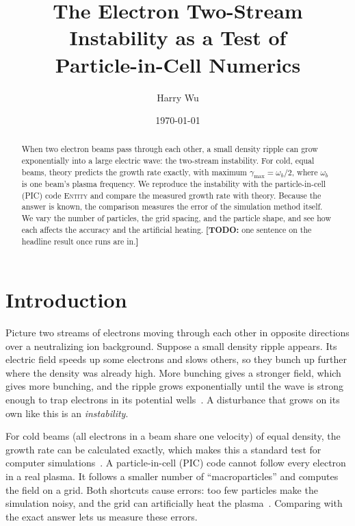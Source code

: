 \documentclass[10pt,twocolumn,letterpaper]{article}
\title{\vspace{-1.5em}The Electron Two-Stream Instability as a Test of\\
       Particle-in-Cell Numerics}
\author{Harry Wu}
\date{\today}
\newcommand{\wb}{\omega_b}            %
\newif\ifdraft \drafttrue
\newcommand{\todo}[1]{\ifdraft{\color{red}\textbf{[TODO:} #1\textbf{]}}\fi}
\begin{document}
\maketitle

\begin{abstract}
\noindent
When two electron beams pass through each other, a small density ripple can grow exponentially
into a large electric wave: the two-stream instability. For cold, equal beams, theory predicts
the growth rate exactly, with maximum $\gamma_{\max}=\wb/2$, where $\wb$ is one beam's plasma
frequency. We reproduce the instability with the particle-in-cell (PIC) code \textsc{Entity}
and compare the measured growth rate with theory. Because the answer is known, the comparison
measures the error of the simulation method itself. We vary the number of particles, the grid
spacing, and the particle shape, and see how each affects the accuracy and the artificial heating.
\todo{one sentence on the headline result once runs are in.}
\end{abstract}

\section{Introduction}
\label{sec:intro}

Picture two streams of electrons moving through each other in opposite directions over a
neutralizing ion background. Suppose a small density ripple appears. Its electric field speeds
up some electrons and slows others, so they bunch up further where the density was already high.
More bunching gives a stronger field, which gives more bunching, and the ripple grows
exponentially until the wave is strong enough to trap electrons in its potential
wells~\citep{BohmGross1949,Chen2016}. A disturbance that grows on its own like this is an
\emph{instability}.

For cold beams (all electrons in a beam share one velocity) of equal density, the growth rate
can be calculated exactly, which makes this a standard test for computer
simulations~\citep{BirdsallLangdon1991}. A particle-in-cell (PIC) code cannot follow every
electron in a real plasma. It follows a smaller number of ``macroparticles'' and computes the
field on a grid. Both shortcuts cause errors: too few particles make the simulation noisy, and
the grid can artificially heat the plasma~\citep{Langdon1970,Okuda1972}. Comparing with the
exact answer lets us measure these errors.
\end{document}
